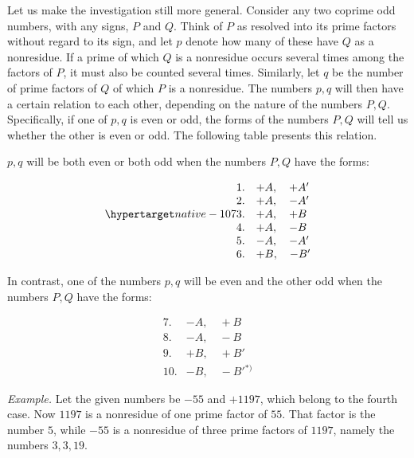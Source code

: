 Let us make the investigation still more general. Consider any two coprime odd numbers, with any signs, $P$ and $Q$. Think of $P$ as resolved into its prime factors without regard to its sign, and let $p$ denote how many of these have $Q$ as a nonresidue. If a prime of which $Q$ is a nonresidue occurs several times among the factors of $P$, it must also be counted several times. Similarly, let $q$ be the number of prime factors of $Q$ of which $P$ is a nonresidue. The numbers $p,q$ will then have a certain relation to each other, depending on the nature of the numbers $P,Q$. Specifically, if one of $p,q$ is even or odd, the forms of the numbers $P,Q$ will tell us whether the other is even or odd. The following table presents this relation.

$p,q$ will be both even or both odd when the numbers $P,Q$ have the forms:

\[
\begin{array}{rl}1.&+A,\quad+A'\\2.&+A,\quad-A'\\\SourceLeaf{107}3.&+A,\quad+B\\4.&+A,\quad-B\\5.&-A,\quad-A'\\6.&+B,\quad-B'\end{array}
\]

In contrast, one of the numbers $p,q$ will be even and the other odd when the numbers $P,Q$ have the forms:

\[
\begin{array}{rl}7.&-A,\quad+B\\8.&-A,\quad-B\\9.&+B,\quad+B'\\10.&-B,\quad-B'{}^{*)}\end{array}
\]


\emph{Example.} Let the given numbers be $-55$ and $+1197$, which belong to the fourth case. Now $1197$ is a nonresidue of one prime factor of $55$. That factor is the number $5$, while $-55$ is a nonresidue of three prime factors of $1197$, namely the numbers $3,3,19$.

